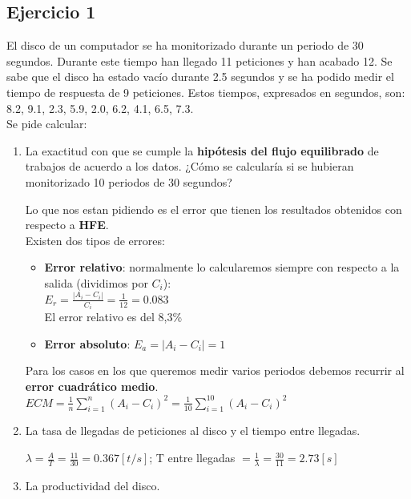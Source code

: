 \subsection{Ejercicio 1}
El disco de un computador se ha monitorizado durante un periodo de 30 segundos. Durante este tiempo
han llegado 11 peticiones y han acabado 12. Se sabe que el disco ha estado vacío durante 2.5 segundos y
se ha podido medir el tiempo de respuesta de 9 peticiones. Estos tiempos, expresados en segundos, son:\\
8.2, 9.1, 2.3, 5.9, 2.0, 6.2, 4.1, 6.5, 7.3. \\Se pide calcular:
\begin{enumerate}
    \item La exactitud con que se cumple la \textbf{hipótesis del flujo equilibrado} de trabajos de acuerdo a los datos. ¿Cómo se calcularía si se hubieran monitorizado 10 periodos de 30 segundos?
        \begin{tcolorbox}[colback=white,colframe=cyan!50!black,fonttitle=\bfseries]
        Lo que nos estan pidiendo es el error que tienen los resultados obtenidos con respecto a \textbf{HFE}.\\
        Existen dos tipos de errores:
        \begin{itemize}
            \item \textbf{Error relativo}: normalmente lo calcularemos siempre con respecto a la salida (dividimos por $C_i$):\\ $E_r=\frac{|A_i - C_i|}{C_i}=\frac{1}{12}=0.083$\\
            El error relativo es del 8,3\%
            \item \textbf{Error absoluto}: $E_a=|A_i-C_i|=1$
        \end{itemize}
        Para los casos en los que queremos medir varios periodos debemos recurrir al \textbf{error cuadrático medio}. $ECM = \frac{1}{n}\sum_{i=1}^{n}(A_i - C_i)^2 = \frac{1}{10}\sum_{i=1}^{10}(A_i - C_i)^2$
        \end{tcolorbox}
    \item La tasa de llegadas de peticiones al disco y el tiempo entre llegadas.
    \begin{tcolorbox}[colback=white,colframe=cyan!50!black,fonttitle=\bfseries]
$\lambda = \frac{A}{T}=\frac{11}{30}=0.367[t/s]$; T entre llegadas $ = \frac{1}{\lambda}=\frac{30}{11}=2.73[s]$
    \end{tcolorbox}
    \item La productividad del disco.
    \begin{tcolorbox}[colback=white,colframe=cyan!50!black,fonttitle=\bfseries]

\end{tcolorbox}
\end{enumerate}
